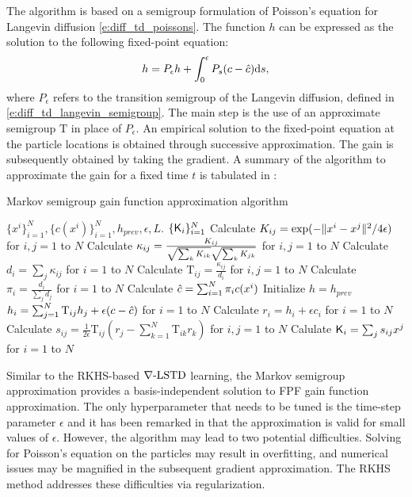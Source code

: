The algorithm is based on a semigroup formulation of Poisson's equation for Langevin diffusion \eqref{e:diff_td_poissons}. The function $h$ can be expressed as the solution to the following fixed-point equation:
\begin{equation}
h = P_\epsilon h + \int_0^\epsilon P_s (c - {\hat c}) \text{d} s,
\end{equation}
where $P_\epsilon$ refers to the transition semigroup of the Langevin diffusion, defined in \eqref{e:diff_td_langevin_semigroup}. The main step is the use of an approximate semigroup $\text{T}$ in place of $P_\epsilon$.
An empirical solution to the fixed-point equation at the particle locations is obtained through successive approximation. The gain is subsequently obtained by taking the gradient.  A summary of the algorithm to approximate the gain for a fixed time $t$ is tabulated in :
\begin{algorithm}{Markov semigroup gain function approximation algorithm}
\begin{algorithmic}[1]
	\Require $\{x^i\}_{i=1}^N, \{c(x^i)\}_{i=1}^N, h_{prev}, \epsilon, L$.
	\Ensure $\{\text{\sf K}_i\}_{i=1}^N$
	\State Calculate $K_{ij} = \exp(-\|x^i - x^j\|^2/ 4\epsilon)$ for $i,j = 1$ to $N$  
	\State Calculate $\kappa_{ij} = \frac{K_{ij}}{\sqrt{\sum_k K_{ik}}\sqrt{\sum_k K_{jk}}}$ for $i,j =1$ to $N$
	\State Calculate $d_i = \sum_j \kappa_{ij}$ for $i=1$ to $N$
	\State Calculate $\text{T}_{ij} = \frac{\kappa_{ij}}{d_i}$ for $i,j = 1$ to $N$ 
	\State Calculate $\pi_i = \frac{d_i}{\sum_j d_j}$ for $i=1$ to $N$
	\State Calculate $ {\hat c} = \sum_{i = 1}^N \pi_i c(x^i)$
	\State Initialize $h =h_{prev}$
		 \State $h_i = \sum_{j=1}^N \text{T}_{ij} h_j + \epsilon (c - {\hat c})$ for $i=1$ to $N$ 
		\EndFor
	\State Calculate $r_i = h_i + \epsilon c_i$ for $i=1$ to $N$
	\State Calculate $s_{ij} = \frac{1}{2\epsilon} \text{T}_{ij} (r_j - \sum_{k=1}^N \text{T}_{ik} r_k)$ for $i,j=1$ to $N$ 
	\State Calulate $\text{\sf K}_i  = \sum_j s_{ij} x^j$ for $i =1$ to $N$ 
	\label{alg:coifman}
\end{algorithmic}
\end{algorithm}

Similar to the RKHS-based $\nabla\text{-LSTD}$ learning, the Markov semigroup approximation provides a basis-independent solution to FPF gain function approximation. The only hyperparameter that needs to be tuned is the time-step parameter $\epsilon$ and it has been remarked in \cite{tagmeh16} that the approximation is valid for small values of $\epsilon$. However, the algorithm may lead to two potential difficulties. Solving for Poisson's equation on the particles may result in overfitting,  and numerical issues may be magnified in the subsequent gradient approximation. The RKHS method addresses these difficulties via regularization. 

